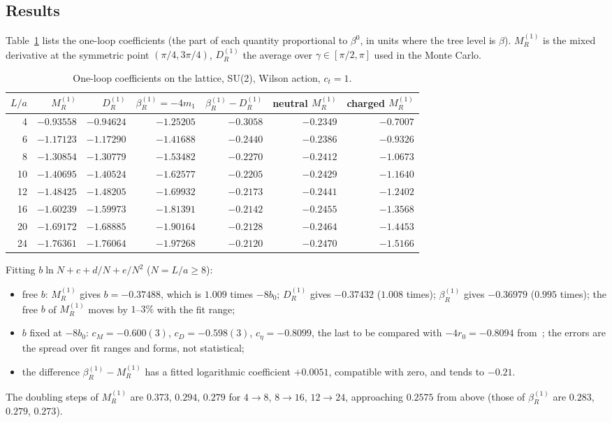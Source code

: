\documentclass[11pt,a4paper]{article}
\theoremstyle{definition}
\theoremstyle{remark}
\newcommand{\bR}{\beta_R}
\newcommand{\DR}{D_R}
\begin{document}
\subsection{Results}

Table~\ref{tab:oneloop} lists the one-loop coefficients (the part of each quantity proportional to $\beta^0$, in units where the tree level is $\beta$). $M_R^{(1)}$ is the mixed derivative at the symmetric point $(\pi/4,3\pi/4)$, $\DR^{(1)}$ the average over $\gamma\in[\pi/2,\pi]$ used in the Monte Carlo.

\begin{table}[ht]\centering\footnotesize\setlength{\tabcolsep}{3.5pt}
\caption{One-loop coefficients on the lattice, SU(2), Wilson action, $c_t=1$.}\label{tab:oneloop}
\begin{tabular}{@{}rrrrrrr@{}}\toprule
$L/a$ & $M_R^{(1)}$ & $\DR^{(1)}$ & $\bR^{(1)}=-4m_1$ & $\bR^{(1)}-\DR^{(1)}$ & neutral $M_R^{(1)}$ & charged $M_R^{(1)}$\\\midrule
4 & $-0.93558$ & $-0.94624$ & $-1.25205$ & $-0.3058$ & $-0.2349$ & $-0.7007$\\
6 & $-1.17123$ & $-1.17290$ & $-1.41688$ & $-0.2440$ & $-0.2386$ & $-0.9326$\\
8 & $-1.30854$ & $-1.30779$ & $-1.53482$ & $-0.2270$ & $-0.2412$ & $-1.0673$\\
10 & $-1.40695$ & $-1.40524$ & $-1.62577$ & $-0.2205$ & $-0.2429$ & $-1.1640$\\
12 & $-1.48425$ & $-1.48205$ & $-1.69932$ & $-0.2173$ & $-0.2441$ & $-1.2402$\\
16 & $-1.60239$ & $-1.59973$ & $-1.81391$ & $-0.2142$ & $-0.2455$ & $-1.3568$\\
20 & $-1.69172$ & $-1.68885$ & $-1.90164$ & $-0.2128$ & $-0.2464$ & $-1.4453$\\
24 & $-1.76361$ & $-1.76064$ & $-1.97268$ & $-0.2120$ & $-0.2470$ & $-1.5166$\\\bottomrule
\end{tabular}
\end{table}

Fitting $b\ln N+c+d/N+e/N^2$ ($N=L/a\ge8$):
\begin{itemize}[leftmargin=2em]
\item free $b$: $M_R^{(1)}$ gives $b=-0.37488$, which is $1.009$ times $-8b_0$; $\DR^{(1)}$ gives $-0.37432$ ($1.008$ times); $\bR^{(1)}$ gives $-0.36979$ ($0.995$ times); the free $b$ of $M_R^{(1)}$ moves by $1$--$3\%$ with the fit range;
\item $b$ fixed at $-8b_0$: $c_M=-0.600(3)$, $c_D=-0.598(3)$, $c_\eta=-0.8099$, the last to be compared with $-4r_0=-0.8094$ from~\cite[(7.39)]{LNWW}; the errors are the spread over fit ranges and forms, not statistical;
\item the difference $\bR^{(1)}-M_R^{(1)}$ has a fitted logarithmic coefficient $+0.0051$, compatible with zero, and tends to $-0.21$.
\end{itemize}
The doubling steps of $M_R^{(1)}$ are $0.373$, $0.294$, $0.279$ for $4\to8$, $8\to16$, $12\to24$, approaching $0.2575$ from above (those of $\bR^{(1)}$ are $0.283$, $0.279$, $0.273$).
\end{document}
